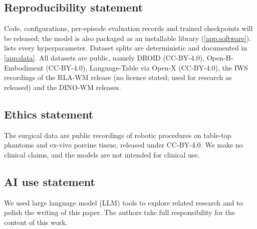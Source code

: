 \subsection*{Reproducibility statement}
Code, configurations, per-episode evaluation records and trained checkpoints will be released; the model is
also packaged as an installable library (\cref{app:software}).
 lists every hyperparameter. Dataset splits are deterministic and documented in
\cref{app:data}. All datasets are public, namely DROID (CC-BY-4.0), Open-H-Embodiment (CC-BY-4.0), Language-Table via Open-X (CC-BY-4.0), the IWS recordings of the RLA-WM release (no licence stated; used for research as released) and the DINO-WM
releases.

\subsection*{Ethics statement}
The surgical data are public recordings of robotic procedures on table-top phantoms and ex-vivo porcine tissue,
released under CC-BY-4.0. We make no clinical claims, and the models are not intended for clinical
use.

\subsection*{AI use statement}
We used large language model (LLM) tools to explore related research and to polish the writing of this paper. The authors take full responsibility for the content of this work.
